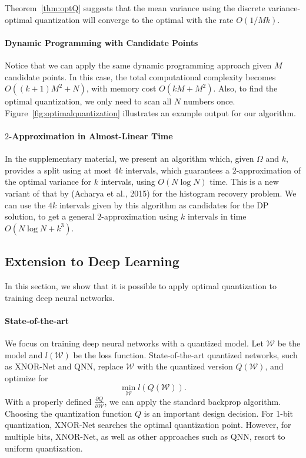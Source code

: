 \documentclass{article}
\begin{document}
Theorem~\ref{thm:optQ} suggests that the mean variance using the discrete variance-optimal quantization will converge to the optimal with the rate $O(1/Mk)$.

\paragraph*{Dynamic Programming with Candidate Points}
Notice that we can apply the same dynamic programming approach given $M$ candidate points. 
In this case, the total computational complexity becomes $O((k+1)M^2 + N)$, with memory cost 
$O(kM + M^2)$. Also, to find the optimal quantization,  we only need to scan all $N$ numbers once.
Figure~\ref{fig:optimalquantization} illustrates an example output for our algorithm.

\paragraph*{$2$-Approximation in Almost-Linear Time} 
In the supplementary material, we present an algorithm which, given $\Omega$ and $k$, provides a split using at most $4 k$ intervals, which guarantees a $2$-approximation of the optimal variance for $k$ intervals, using $O( N \log N )$ time. This 
is a new variant of that by (Acharya et al., 2015) for the histogram recovery problem. 
We can use the $4k$ intervals given by this algorithm as candidates for the DP solution, to get a general $2$-approximation using $k$ intervals in time $O( N \log N + k^3)$. 

\subsection{Extension to Deep Learning}

In this section, we show that it is possible 
to apply optimal quantization to
training deep neural networks.

\paragraph*{State-of-the-art} We focus on
training deep neural networks with a quantized
model. Let $\mathcal{W}$ be the model and 
$l(\mathcal{W})$ be the loss function. State-of-the-art quantized networks,
such as XNOR-Net and QNN, replace $\mathcal{W}$
with the quantized version $Q(\mathcal{W})$, and optimize
for
\[
\min_{\mathcal{W}} l(Q(\mathcal{W})).
\]
With a properly defined 
$\frac{\partial Q}{\partial{\mathcal{W}}}$, we can
apply the standard backprop 
algorithm.
Choosing the quantization function $Q$ is
an important design decision. For 1-bit quantization,
XNOR-Net searches the optimal quantization point. However, for multiple bits,
XNOR-Net, as well as other approaches such as QNN, resort
to uniform quantization.
\end{document}
